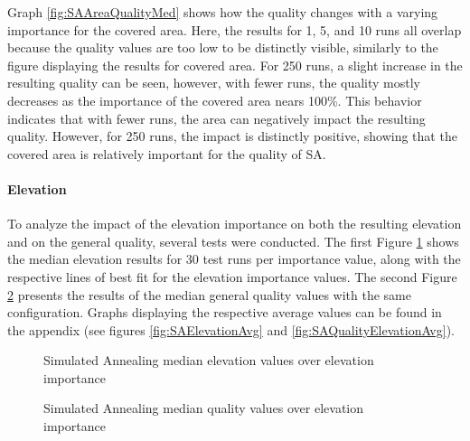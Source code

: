 Graph \ref{fig:SAAreaQualityMed} shows how the quality changes with a varying importance for the covered area.
Here, the results for 1, 5, and 10 runs all overlap because the quality values are too low to be distinctly visible, similarly to the figure displaying the results for covered area.
For 250 runs, a slight increase in the resulting quality can be seen, however, with fewer runs, the quality mostly decreases as the importance of the covered area nears 100\%.
This behavior indicates that with fewer runs, the area can negatively impact the resulting quality.
However, for 250 runs, the impact is distinctly positive, showing that the covered area is relatively important for the quality of SA.


\paragraph{Elevation}

To analyze the impact of the elevation importance on both the resulting elevation and on the general quality, several tests were conducted.
The first Figure \ref{fig:SAElevationMed} shows the median elevation results for 30 test runs per importance value, along with the respective lines of best fit for the elevation importance values.
The second Figure \ref{fig:SAQualityElevationMed} presents the results of the median general quality values with the same configuration.
Graphs displaying the respective average values can be found in the appendix (see figures \ref{fig:SAElevationAvg} and \ref{fig:SAQualityElevationAvg}).



\begin{figure}
	\centering
	
	\caption{Simulated Annealing median elevation values over elevation importance}
	\label{fig:SAElevationMed}
\end{figure}



\begin{figure}
	\centering
	
	\caption{Simulated Annealing median quality values over elevation importance}
	\label{fig:SAQualityElevationMed}
\end{figure}

